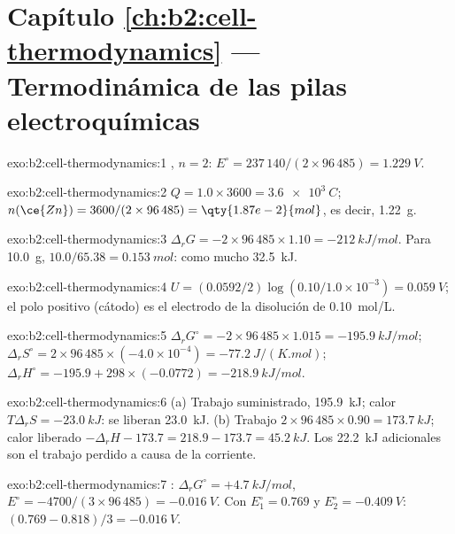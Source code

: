 \section*{Capítulo \ref{ch:b2:cell-thermodynamics} --- Termodinámica de las pilas electroquímicas}

\begin{solution}{exo:b2:cell-thermodynamics:1}
, $n = 2$: $E^\circ = 237\,140/(2 \times 96\,485) =
\qty{1.229}{V}$.
\end{solution}

\begin{solution}{exo:b2:cell-thermodynamics:2}
$Q = 1.0 \times 3600 = \qty{3.6e3}{C}$; $n(\ce{Zn}) = 3600/(2 \times 96\,485) =
\qty{1.87e-2}{mol}$, es decir, \qty{1.22}{g}.
\end{solution}

\begin{solution}{exo:b2:cell-thermodynamics:3}
$\Delta_r G = -2 \times 96\,485 \times 1.10 = \qty{-212}{kJ/mol}$. Para
\qty{10.0}{g}, $10.0/65.38 = \qty{0.153}{mol}$: como mucho \qty{32.5}{kJ}.
\end{solution}

\begin{solution}{exo:b2:cell-thermodynamics:4}
$U = (0.0592/2)\log(0.10/1.0 \times 10^{-3}) = \qty{0.059}{V}$; el polo positivo
(cátodo) es el electrodo de la disolución de \qty{0.10}{mol/L}.
\end{solution}

\begin{solution}{exo:b2:cell-thermodynamics:5}
$\Delta_r G^\circ = -2 \times 96\,485 \times 1.015 = \qty{-195.9}{kJ/mol}$;
$\Delta_r S^\circ = 2 \times 96\,485 \times (-4.0 \times 10^{-4}) =
\qty{-77.2}{J/(K.mol)}$; $\Delta_r H^\circ = -195.9 + 298 \times (-0.0772) =
\qty{-218.9}{kJ/mol}$.
\end{solution}

\begin{solution}{exo:b2:cell-thermodynamics:6}
(a) Trabajo suministrado, \qty{195.9}{kJ}; calor $T\Delta_r S = \qty{-23.0}{kJ}$: se liberan \qty{23.0}{kJ}.
(b) Trabajo $2 \times 96\,485 \times 0.90 = \qty{173.7}{kJ}$; calor liberado
$-\Delta_r H - 173.7 = 218.9 - 173.7 = \qty{45.2}{kJ}$. Los
\qty{22.2}{kJ} adicionales son el trabajo perdido a causa de la corriente.
\end{solution}

\begin{solution}{exo:b2:cell-thermodynamics:7}
: $\Delta_r G^\circ = +\qty{4.7}{kJ/mol}$, $E^\circ =
-4700/(3 \times 96\,485) = \qty{-0.016}{V}$. Con $E_1^\circ = 0.769$ y
$E_2^\circ = \qty{-0.409}{V}$: $(0.769 - 0.818)/3 = \qty{-0.016}{V}$.
\end{solution}


